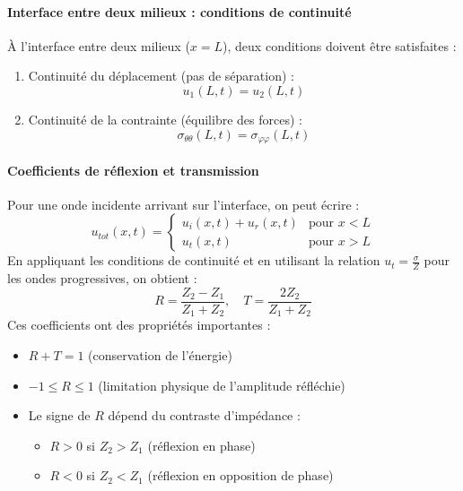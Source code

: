 \documentclass[10pt]{book}
\begin{document}
\paragraph{Interface entre deux milieux : conditions de continuité}
À l'interface entre deux milieux ($x = L$), deux conditions doivent être satisfaites :
\begin{enumerate}
\item Continuité du déplacement (pas de séparation) :
$$u_1(L,t) = u_2(L,t)$$
\item Continuité de la contrainte (équilibre des forces) :
$$\sigma_{\theta\theta}(L,t) = \sigma_{\varphi\varphi}(L,t)$$
\end{enumerate}
\paragraph{Coefficients de réflexion et transmission}
Pour une onde incidente arrivant sur l'interface, on peut écrire :
$$u_{tot}(x,t) = \begin{cases}
u_i(x,t) + u_r(x,t) & \text{pour } x < L \\
u_t(x,t) & \text{pour } x > L
\end{cases}$$
En appliquant les conditions de continuité et en utilisant la relation $u_t = \frac{\sigma}{Z}$ pour les ondes progressives, on obtient :
$$R = \frac{Z_2 - Z_1}{Z_1 + Z_2}, \quad T = \frac{2Z_2}{Z_1 + Z_2}$$
Ces coefficients ont des propriétés importantes :
\begin{itemize}
\item $R + T = 1$ (conservation de l'énergie)
\item $-1 \leq R \leq 1$ (limitation physique de l'amplitude réfléchie)
\item Le signe de $R$ dépend du contraste d'impédance :
\begin{itemize}
\item $R > 0$ si $Z_2 > Z_1$ (réflexion en phase)
\item $R < 0$ si $Z_2 < Z_1$ (réflexion en opposition de phase)
\end{itemize}
\end{itemize}
\end{document}
